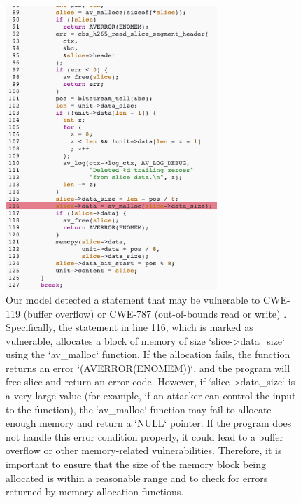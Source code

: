 \documentclass{ieeeaccess}
\begin{document}
\begin{figure}[h!]
  \centering
    \includegraphics[width=80mm, align=center]{c_sample.png}
    \caption{Our model detected a statement that may be vulnerable  to  CWE-119 (buffer overflow) or CWE-787 (out-of-bounds read or write) . Specifically, the statement in line 116, which is marked as vulnerable, allocates a block of memory of size `slice->data\_size` using the `av\_malloc` function. If the allocation fails, the function returns an error `(AVERROR(ENOMEM))`, and the program will free slice and return an error code. However, if `slice->data\_size` is a very large value (for example, if an attacker can control the input to the function), the `av\_malloc` function may fail to allocate enough memory and return a `NULL` pointer. If the program does not handle this error condition properly, it could lead to a buffer overflow or other memory-related vulnerabilities. Therefore, it is important to ensure that the size of the memory block being allocated is within a reasonable range and to check for errors returned by memory allocation functions.}
    \label{fig:c_sample}
\end{figure}
\end{document}
